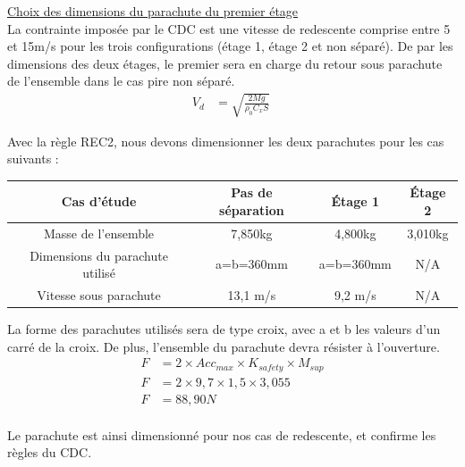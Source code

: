 \underline{Choix des dimensions du parachute du premier étage}\\
La contrainte imposée par le \acrshort{CDC} est une vitesse de redescente comprise entre 5 et 15m/s pour les trois
configurations (étage 1, étage 2 et non séparé). De par les dimensions des deux étages, le premier sera en charge du retour
sous parachute de l'ensemble dans le cas pire non séparé.
\begin{equation}
\begin{aligned}
    V_d &= \sqrt{\frac{2 M g}{\rho_0 C_x S}} \
\end{aligned}
\end{equation}

Avec la règle REC2, nous devons dimensionner les deux parachutes pour les cas suivants :

\begin{table}[h!]
    \centering
    \begin{tabular}{|c|c|c|c|}
        \hline
        Cas d'étude & Pas de séparation & Étage 1 & Étage 2 \\ \hline
        Masse de l'ensemble & 7,850kg & 4,800kg & 3,010kg \\ \hline
        Dimensions du parachute utilisé & a=b=360mm & a=b=360mm & N/A \\ \hline
        Vitesse sous parachute & 13,1 m/s & 9,2 m/s & N/A \\ \hline
    \end{tabular}
\end{table}

La forme des parachutes utilisés sera de type croix, avec a et b les valeurs d'un carré de la croix. De plus, l'ensemble du
parachute devra résister à l'ouverture.
\begin{equation}
\begin{aligned}
    F &= 2 \times Acc_{max} \times K_{safety} \times M_{sup} \\
    F &= 2 \times 9,7 \times 1,5 \times 3,055 \\
    F &= 88,90 N \\
\end{aligned}
\end{equation}

Le parachute est ainsi dimensionné pour nos cas de redescente, et confirme les règles du \acrshort{CDC}.


\newpage

